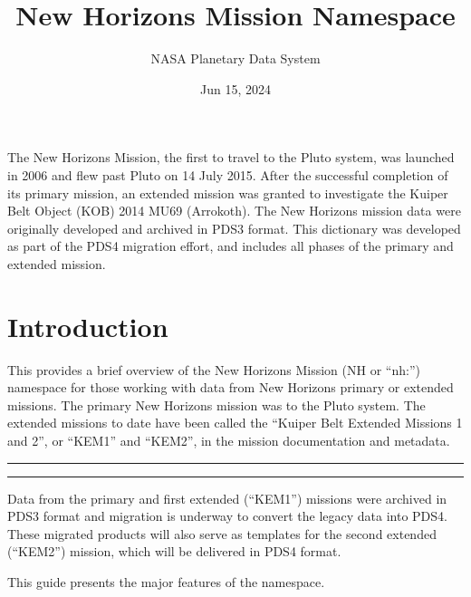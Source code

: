 \documentclass[letterpaper,10pt,english]{sphinxmanual}
\title{New Horizons Mission Namespace}
\date{Jun 15, 2024}
\author{NASA Planetary Data System}
\begin{document}
\pagestyle{empty}
\sphinxmaketitle
\pagestyle{plain}
\sphinxtableofcontents
\pagestyle{normal}
\label{\detokenize{index::doc}}


\sphinxAtStartPar
The New Horizons Mission, the first to travel to the Pluto system, was launched
in 2006 and flew past Pluto on 14 July 2015. After the successful completion of
its primary mission, an extended mission was granted to investigate the Kuiper
Belt Object (KOB) 2014 MU69 (Arrokoth). The New Horizons mission data were
originally developed and archived in PDS3 format. This dictionary was developed
as part of the PDS4 migration effort, and includes all phases of the primary and
extended mission.

\sphinxstepscope


\chapter{Introduction}
\label{\detokenize{user/user-guide:introduction}}\label{\detokenize{user/user-guide::doc}}
\sphinxAtStartPar
This  provides a brief overview of the
New Horizons Mission (NH or “nh:”) namespace for those working with data from
New Horizons primary or extended missions. The primary New Horizons mission
was to the Pluto system. The extended missions to date have been called
the “Kuiper Belt Extended Missions 1 and 2”, or “KEM1” and “KEM2”, in the
mission documentation and metadata.


\bigskip\hrule\bigskip

\begin{quote}

\sphinxAtStartPar
{} 
\end{quote}


\bigskip\hrule\bigskip


\sphinxAtStartPar
Data from the primary and first extended (“KEM1”)
missions were archived in PDS3 format and migration is underway to convert the
legacy data into PDS4. These migrated products will also serve as templates for the
second extended (“KEM2”) mission, which will be delivered in PDS4 format.

\sphinxAtStartPar
This guide presents the major features of the namespace.
\end{document}
